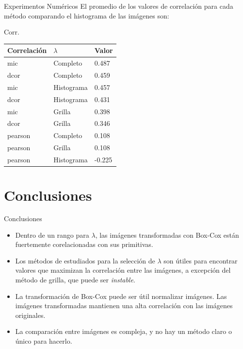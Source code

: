 \documentclass{beamer}
\begin{document}
\begin{frame}{Experimentos Numéricos}
    El promedio de los valores de correlación para cada método comparando el histograma de las imágenes son:
    \pause
    \begin{block}{Corr.} 
        \begin{table}[H]
            \centering
            \begin{tabular}{|l|l|l|}\hline
            Correlaci\'on    & $\lambda$ & Valor  \\    \hline
            mic     & Completo    & 0.487  \\
            dcor    & Completo    & 0.459  \\
            mic     & Histograma  & 0.457  \\
            dcor    & Histograma  & 0.431  \\
            mic     & Grilla      & 0.398  \\
            dcor    & Grilla      & 0.346 \\
            pearson & Completo    & 0.108  \\
            pearson & Grilla      & 0.108  \\
            pearson & Histograma  & -0.225 \\\hline
            \end{tabular}
        \end{table}
    \end{block}
\end{frame}

\section{Conclusiones}

\begin{frame}{Conclusiones}
    
    \begin{itemize}
        \pause
        \item Dentro de un rango para $\lambda$, las imágenes transformadas con Box-Cox están fuertemente corelacionadas con sus primitivas. 
        \pause
        \item Los métodos de estudiados para la selección de $\lambda$ son útiles para encontrar valores que maximizan la correlación entre las imágenes, a excepción del método de grilla, que puede ser \textit{instable}.
        \pause
        \item La transformación de Box-Cox puede ser útil normalizar imágenes. Las imágenes transformadas mantienen una alta correlación con las imágenes originales.
        \pause
        \item La comparación entre imágenes es compleja, y no hay un método claro o único para hacerlo.
    \end{itemize}
\end{frame}
\end{document}
